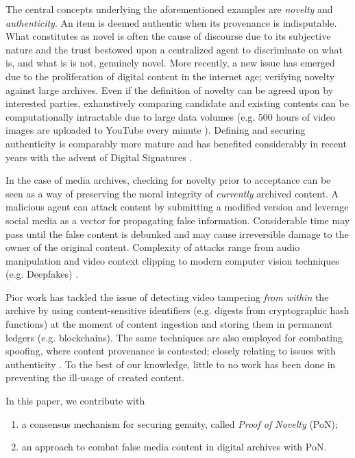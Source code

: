 \documentclass[conference]{IEEEtran}
\begin{document}
The central concepts underlying the aforementioned examples are \emph{novelty} and \emph{authenticity}. An item is deemed authentic when its provenance is indisputable. What constitutes as novel is often the cause of discourse due to its subjective nature and the trust bestowed upon a centralized agent to discriminate on what is, and what is is not, genuinely novel. More recently, a new issue has emerged due to the proliferation of digital content in the internet age; verifying novelty against large archives. Even if the definition of novelty can be agreed upon by interested parties, exhaustively comparing candidate and existing contents can be computationally intractable due to large data volumes (e.g. 500 hours of video images are uploaded to YouTube every minute \cite{robertson2015500}). Defining and securing authenticity is comparably more mature and has benefited considerably in recent years with the advent of Digital Signatures \cite{pointcheval2000security}.

In the case of media archives, checking for novelty prior to acceptance can be seen as a way of preserving the moral integrity of \emph{currently} archived content. A malicious agent can attack content by submitting a modified version and leverage social media as a vector for propagating false information. Considerable time may pass until the false content is debunked and may cause irreversible damage to the owner of the original content. Complexity of attacks range from audio manipulation and video context clipping to modern computer vision techniques (e.g. Deepfakes) \cite{chesney2018deep}. 

Pior work has tackled the issue of detecting video tampering \emph{from within} the archive by using content-sensitive identifiers (e.g. digests from cryptographic hash functions) at the moment of content ingestion and storing them in permanent ledgers (e.g. blockchains). The same techniques are also employed for combating spoofing, where content provenance is contested; closely relating to issues with authenticity \cite{hasan2019combating}. To the best of our knowledge, little to no work has been done in preventing the ill-usage of created content.

In this paper, we contribute with

\begin{enumerate}
    \item a consensus mechanism for securing genuity, called \emph{Proof of Novelty} (PoN);
    \item an approach to combat false media content in digital archives with PoN.
\end{enumerate}
\end{document}
